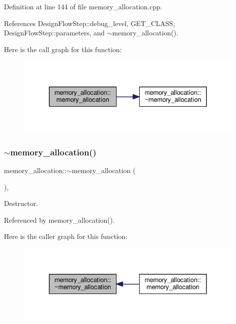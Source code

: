 Definition at line 144 of file memory\+\_\+allocation.\+cpp.



References Design\+Flow\+Step\+::debug\+\_\+level, G\+E\+T\+\_\+\+C\+L\+A\+SS, Design\+Flow\+Step\+::parameters, and $\sim$memory\+\_\+allocation().

Here is the call graph for this function\+:
\nopagebreak
\begin{figure}[H]
\begin{center}
\leavevmode
\includegraphics[width=324pt]{db/d9f/classmemory__allocation_a33e5867e0afa36110b75e50885414a6b_cgraph}
\end{center}
\end{figure}
\mbox{\label{classmemory__allocation_a4454e6e5d1907c813cae74fbfc5287c2}} 
\subsubsection{\texorpdfstring{$\sim$memory\+\_\+allocation()}{~memory\_allocation()}}
{\footnotesize\ttfamily memory\+\_\+allocation\+::$\sim$memory\+\_\+allocation (\begin{DoxyParamCaption}{ }\end{DoxyParamCaption})\hspace{0.3cm}{\ttfamily [override]}, {\ttfamily [default]}}



Destructor. 



Referenced by memory\+\_\+allocation().

Here is the caller graph for this function\+:
\nopagebreak
\begin{figure}[H]
\begin{center}
\leavevmode
\includegraphics[width=324pt]{db/d9f/classmemory__allocation_a4454e6e5d1907c813cae74fbfc5287c2_icgraph}
\end{center}
\end{figure}


